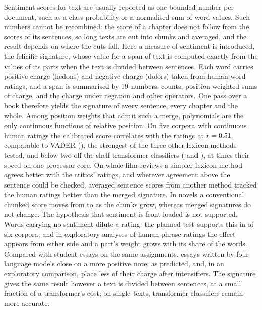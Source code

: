 Sentiment scores for text are usually reported as one bounded number per document, such as a class probability or a normalised sum of word values. Such numbers cannot be recombined: the score of a chapter does not follow from the scores of its sentences, so long texts are cut into chunks and averaged, and the result depends on where the cuts fall. Here a measure of sentiment is introduced, the felicific signature, whose value for a span of text is computed exactly from the values of its parts when the text is divided between sentences. Each word carries positive charge (hedons) and negative charge (dolors) taken from human word ratings, and a span is summarised by 19 numbers: counts, position-weighted sums of charge, and the charge under negation and other operators. One pass over a book therefore yields the signature of every sentence, every chapter and the whole. Among position weights that admit such a merge, polynomials are the only continuous functions of relative position. On five corpora with continuous human ratings the calibrated score correlates with the ratings at $r=0.51$, comparable to VADER (\meanVader), the strongest of the three other lexicon methods tested, and below two off-the-shelf transformer classifiers (\meanDistil{} and \meanRoberta), at \speedTimes{} times their speed on one processor core. On whole film reviews a simpler lexicon method agrees better with the critics' ratings, and wherever agreement above the sentence could be checked, averaged sentence scores from another method tracked the human ratings better than the merged signature. In \vaderBooks{} novels a conventional chunked score moves from \vaderOne{} to \vaderChapter{} as the chunks grow, whereas merged signatures do not change. The hypothesis that sentiment is front-loaded is not supported. Words carrying no sentiment dilute a rating: the planned test supports this in \winsNoDil{} of six corpora, and in exploratory analyses of human phrase ratings the effect appears from either side and a part's weight grows with its share of the words. Compared with student essays on the same assignments, essays written by four language models close on a more positive note, as predicted, and, in an exploratory comparison, place less of their charge after intensifiers. The signature gives the same result however a text is divided between sentences, at a small fraction of a transformer's cost; on single texts, transformer classifiers remain more accurate.
